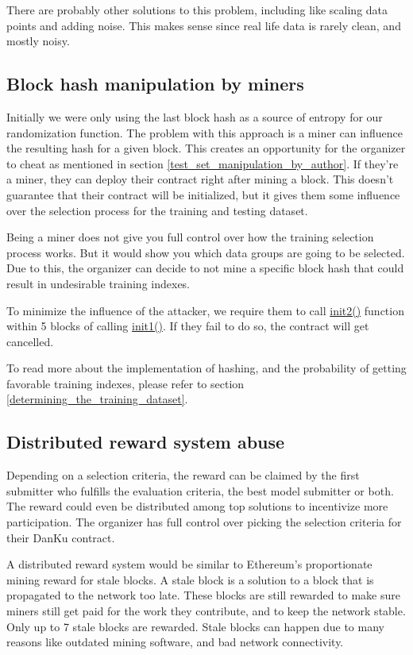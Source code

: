 \documentclass{article}
\begin{document}
There are probably other solutions to this problem, including like scaling data points and adding noise. This makes sense since real life data is rarely clean, and mostly noisy.

\subsection{Block hash manipulation by miners}

Initially we were only using the last block hash as a source of entropy for our randomization function. The problem with this approach is a miner can influence the resulting hash for a given block. This creates an opportunity for the organizer to cheat as mentioned in section \ref{test_set_manipulation_by_author}. If they’re a miner, they can deploy their contract right after mining a block. This doesn’t guarantee that their contract will be initialized, but it gives them some influence over the selection process for the training and testing dataset.

Being a miner does not give you full control over how the training selection process works. But it would show you which data groups are going to be selected. Due to this, the organizer can decide to not mine a specific block hash that could result in undesirable training indexes.

To minimize the influence of the attacker, we require them to call \underline{init2()} function within 5 blocks of calling \underline{init1()}. If they fail to do so, the contract will get cancelled.

To read more about the implementation of hashing, and the probability of getting favorable training indexes, please refer to section \ref{determining_the_training_dataset}.

\subsection{Distributed reward system abuse}

Depending on a selection criteria, the reward can be claimed by the first submitter who fulfills the evaluation criteria, the best model submitter or both. The reward could even be distributed among top solutions to incentivize more participation. The organizer has full control over picking the selection criteria for their DanKu contract.

A distributed reward system would be similar to Ethereum's proportionate mining reward for stale blocks. A stale block is a solution to a block that is propagated to the network too late. These blocks are still rewarded to make sure miners still get paid for the work they contribute, and to keep the network stable. Only up to 7 stale blocks are rewarded. Stale blocks can happen due to many reasons like outdated mining software, and bad network connectivity.  \cite{eth_paper}
\end{document}
